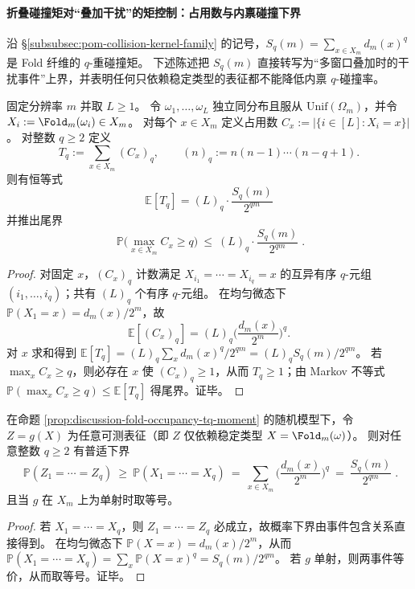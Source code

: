 \paragraph{折叠碰撞矩对“叠加干扰”的矩控制：占用数与内禀碰撞下界}
沿 \S\ref{subsubsec:pom-collision-kernel-family} 的记号，\(S_q(m)=\sum_{x\in X_m}d_m(x)^q\) 是 Fold 纤维的 \(q\)-重碰撞矩。
下述陈述把 \(S_q(m)\) 直接转写为“多窗口叠加时的干扰事件”上界，并表明任何只依赖稳定类型的表征都不能降低内禀 \(q\)-碰撞率。

\begin{proposition}\label{prop:discussion-fold-occupancy-tq-moment}
固定分辨率 \(m\) 并取 \(L\ge 1\)。
令 \(\omega_1,\dots,\omega_L\) 独立同分布且服从 \(\mathrm{Unif}(\Omega_m)\)，并令 \(X_i:=\Fold_m(\omega_i)\in X_m\)。
对每个 \(x\in X_m\) 定义占用数 \(C_x:=|\{i\in[L]:X_i=x\}|\)。
对整数 \(q\ge 2\) 定义
\[
T_q:=\sum_{x\in X_m}(C_x)_q,\qquad (n)_q:=n(n-1)\cdots(n-q+1).
\]
则有恒等式
\[
\boxed{\;\mathbb{E}[T_q]=(L)_q\cdot \frac{S_q(m)}{2^{qm}}\;}
\]
并推出尾界
\[
\boxed{\;\mathbb{P}\Big(\max_{x\in X_m}C_x\ge q\Big)\ \le\ (L)_q\cdot \frac{S_q(m)}{2^{qm}}\; }.
\]
\end{proposition}
\begin{proof}
对固定 \(x\)，\((C_x)_q\) 计数满足 \(X_{i_1}=\cdots=X_{i_q}=x\) 的互异有序 \(q\)-元组 \((i_1,\dots,i_q)\)；共有 \((L)_q\) 个有序 \(q\)-元组。
在均匀微态下 \(\mathbb{P}(X_1=x)=d_m(x)/2^m\)，故
\[
\mathbb{E}[(C_x)_q]=(L)_q\Big(\frac{d_m(x)}{2^m}\Big)^q.
\]
对 \(x\) 求和得到 \(\mathbb{E}[T_q]=(L)_q\sum_x d_m(x)^q/2^{qm}=(L)_q S_q(m)/2^{qm}\)。
若 \(\max_x C_x\ge q\)，则必存在 \(x\) 使 \((C_x)_q\ge 1\)，从而 \(T_q\ge 1\)；由 Markov 不等式
\(\mathbb{P}(\max_x C_x\ge q)\le \mathbb{E}[T_q]\) 得尾界。证毕。
\end{proof}

\begin{proposition}[稳定表征的不可约碰撞下界]\label{prop:discussion-fold-representation-qcollision-lower-bound}
在命题 \ref{prop:discussion-fold-occupancy-tq-moment} 的随机模型下，令 \(Z=g(X)\) 为任意可测表征（即 \(Z\) 仅依赖稳定类型 \(X=\Fold_m(\omega)\)）。
则对任意整数 \(q\ge 2\) 有普适下界
\[
\boxed{\;
\mathbb{P}(Z_1=\cdots=Z_q)\ \ge\ \mathbb{P}(X_1=\cdots=X_q)
\ =\ \sum_{x\in X_m}\Big(\frac{d_m(x)}{2^m}\Big)^q
\ =\ \frac{S_q(m)}{2^{qm}}\; }.
\]
且当 \(g\) 在 \(X_m\) 上为单射时取等号。
\end{proposition}
\begin{proof}
若 \(X_1=\cdots=X_q\)，则 \(Z_1=\cdots=Z_q\) 必成立，故概率下界由事件包含关系直接得到。
在均匀微态下 \(\mathbb{P}(X=x)=d_m(x)/2^m\)，从而
\(\mathbb{P}(X_1=\cdots=X_q)=\sum_x \mathbb{P}(X=x)^q=S_q(m)/2^{qm}\)。
若 \(g\) 单射，则两事件等价，从而取等号。证毕。
\end{proof}


